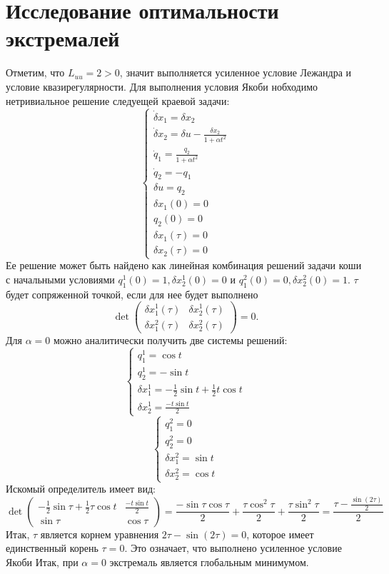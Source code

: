 \documentclass{article}
\begin{document}
\section{Исследование оптимальности экстремалей}
Отметим, что $L_{uu} = 2 > 0$, значит выполняется усиленное условие Лежандра и условие
квазирегулярности.
Для выполнения условия Якоби нобходимо нетривиальное решение следуещей краевой задачи:
\[
  \begin{cases}
    \dot\delta x_{1} = \delta x_{2}\\
    \dot\delta x_{2} = \delta u - \frac{\delta x_{2}}{1 + \alpha t^{2}}\\
    \dot q_{1} = \frac{q_{2}}{1 + \alpha t^{2}}\\
    \dot q_{2} = -q_{1}\\
    \delta u = q_{2} \\
    \delta x_{1}(0) = 0\\
    q_{2}(0) = 0\\
    \delta x_{1}(\tau) = 0\\
    \delta x_{2}(\tau) = 0
  \end{cases}
\]
Ее решение может быть найдено как линейная комбинация решений задачи коши с начальными условиями
$q^{1}_{1}(0) = 1, \delta x^{1}_{2}(0) = 0$ и $q^{2}_{1}(0) = 0, \delta x^{2}_{2}(0) = 1$. $\tau$ будет сопряженной точкой, если для
нее будет выполнено
\[\det\begin{pmatrix}
\delta x^{1}_{1}(\tau) &\delta x^{1}_{2}(\tau)\\
\delta x^{2}_{1}(\tau) &\delta x^{2}_{2}(\tau)
\end{pmatrix} = 0.
\]
Для $\alpha = 0$ можно аналитически получить две системы решений:
\[
\begin{cases}
  q^{1}_{1} = \cos t\\
  q^{1}_{2} = -\sin t\\
  \delta x^{1}_{1} = -\frac 1 2 \sin t + \frac 1 2 t\cos t\\
  \delta x^{1}_{2} = \frac{-t\sin t}2
\end{cases}
\]
\[
\begin{cases}
  q^{2}_{1} = 0\\
  q^{2}_{2} = 0\\
  \delta x^{2}_{1} = \sin t\\
  \delta x^{2}_{2} = \cos t
\end{cases}
\]
Искомый определитель имеет вид:
\[
\det\begin{pmatrix}
  -\frac 1 2 \sin \tau + \frac 1 2 \tau\cos t &\frac{-t\sin t}{2}\\
  \sin \tau &\cos \tau
\end{pmatrix} = \frac{-\sin \tau \cos \tau}{2} + \frac{\tau\cos^{2} \tau}{2} + \frac{\tau\sin^{2}\tau}{2} = \frac{\tau - \frac {\sin(2\tau)}2}{2}
\]
Итак, $\tau$ является корнем уравнения $2\tau - \sin(2\tau) = 0$, которое имеет единственный корень $\tau = 0$.
Это означает, что выполнено усиленное условие Якоби
Итак, при $\alpha = 0$ экстремаль является глобальным минимумом.
\end{document}
